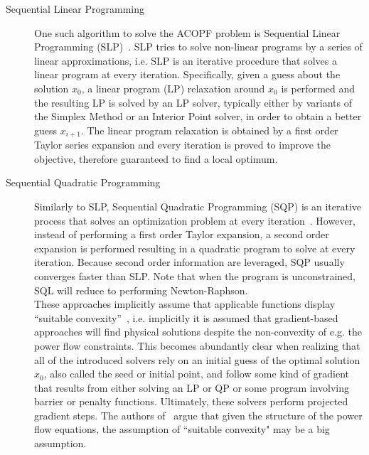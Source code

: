 \documentclass[11pt]{cmuthesis} %
\begin{document}
\begin{description}
\item[Sequential Linear Programming] One such algorithm to solve the ACOPF problem is Sequential Linear Programming (SLP)~\cite{kirschen1988mw}. SLP tries to solve non-linear programs by a series of linear approximations, i.e. SLP is an iterative procedure that solves a linear program at every iteration. Specifically, given a guess about the solution $x_0$, a linear program (LP) relaxation around $x_0$ is performed and the resulting LP is solved by an LP solver, typically either by variants of the Simplex Method or an Interior Point solver, in order to obtain a better guess $x_{i+1}$. The linear program relaxation is obtained by a first order Taylor series expansion and every iteration is proved to improve the objective, therefore guaranteed to find a local optimum.
\item[Sequential Quadratic Programming] Similarly to SLP, Sequential Quadratic Programming (SQP) is an iterative process that solves an optimization problem at every iteration~\cite{grudinin1998reactive}. However, instead of performing a first order Taylor expansion, a second order expansion is performed resulting in a quadratic program to solve at every iteration. Because second order information are leveraged, SQP usually converges faster than SLP. Note that when the program is unconstrained, SQL will reduce to performing Newton-Raphson.\\

These approaches implicitly assume that applicable functions display “suitable convexity”~\cite{carpentier1962contribution}, i.e. implicitly it is assumed that gradient-based approaches will find physical solutions despite the non-convexity of e.g. the power flow constraints. This becomes abundantly clear when realizing that all of the introduced solvers rely on an initial guess of the optimal solution $x_0$, also called the seed or initial point, and follow some kind of gradient that results from either solving an LP or QP or some program involving barrier or penalty functions. Ultimately, these solvers perform projected gradient steps. The authors of~\cite{hiskens2001exploring,schecter2013exploration} argue that given the structure of the power flow equations, the assumption of ``suitable convexity" may be a big assumption.\\


\end{description}
\end{document}
